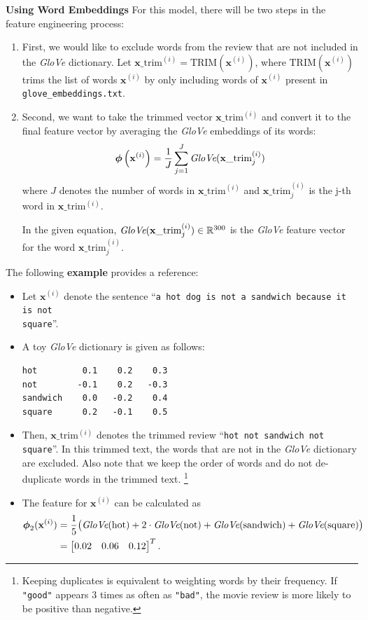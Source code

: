 \documentclass[11pt,addpoints,answers]{exam}
\newcommand{\xv}{\mathbf{x}}
\begin{document}
{\bf Using Word Embeddings }
For this model, there will be two steps in the feature engineering process: 
    
\begin{enumerate}
    \item First, we would like to exclude words from the review that are not included in the  \emph{GloVe} dictionary. Let  $\xv\_\text{trim}^{(i)} = \text{TRIM}(\xv^{(i)})$, where $\text{TRIM}(\xv^{(i)})$ trims the list of words $\xv^{(i)}$ by only including words of $\xv^{(i)}$ present in \texttt{glove\_embeddings.txt}.
    \item Second, we want to take the trimmed vector $\xv\_\text{trim}^{(i)}$ and convert it to the final feature vector by averaging the  \emph{GloVe} embeddings of its words:
    $$\boldsymbol{\phi}\left(\xv^{(i)}\right) = \frac{1}{J} \sum_{j=1}^J \emph{GloVe}(\xv\_\text{trim}^{(i)}_j) $$
    where $J$ denotes the number of words in $\xv\_\text{trim}^{(i)}$ and $\xv\_\text{trim}^{(i)}_j$ is the j-th word in $\xv\_\text{trim}^{(i)}$.
    
     In the given equation, $\emph{GloVe}(\xv\_\text{trim}^{(i)}_j) \in \mathbb{R}^{300}$ is the \emph{GloVe} feature vector for the word $\xv\_\text{trim}^{(i)}_j$.
\end{enumerate}
    
The following \textbf{example} provides a reference:

\begin{itemize}
    \item Let $\xv^{(i)}$ denote the sentence ``\texttt{a hot dog is not a sandwich because it is not\\ square}''.
    \item A toy \emph{GloVe} dictionary is given as follows: 
    \begin{lstlisting}
hot         0.1    0.2    0.3
not        -0.1    0.2   -0.3
sandwich    0.0   -0.2    0.4
square      0.2   -0.1    0.5
    \end{lstlisting}
    \item Then, $\xv\_\text{trim}^{(i)}$ denotes the trimmed review ``\texttt{hot not sandwich not square}''. In this trimmed text, the words that are not in the \emph{GloVe} dictionary are excluded. Also note that we keep the order of words and do not de-duplicate words in the trimmed text. \footnote{Keeping duplicates is equivalent to weighting words by their frequency. If \lstinline{"good"} appears 3 times as often as \lstinline{"bad"}, the movie review is more likely to be positive than negative.}
    \item The feature for $\xv^{(i)}$ can be calculated as
        \begin{align*} \boldsymbol{\phi}_2(\xv^{(i)}) &= \frac{1}{5}\big( \emph{GloVe}(\text{hot}) + 2 \cdot \emph{GloVe}(\text{not}) + \emph{GloVe}(\text{sandwich}) + \emph{GloVe}(\text{square}) \big) \\
        &= \begin{bmatrix} 0.02 & 0.06 & 0.12 \end{bmatrix}^T.
        \end{align*}
\end{itemize}
\end{document}
